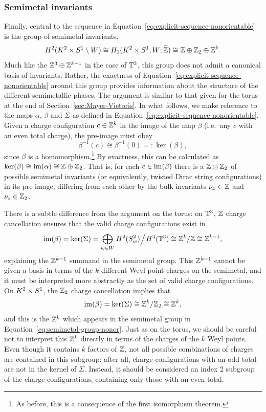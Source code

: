 \subsubsection{Semimetal invariants}

Finally, central to the sequence in Equation~\eqref{eq:explicit-sequence-nonorientable} is the group of semimetal invariants,
\begin{equation}\label{eq:semimetal-group-nonor}
	H^2(K^2\times S^1\setminus W)\cong H_1(K^2\times S^1, W; \widetilde{\mathbb{Z}})\cong \mathbb{Z}\oplus\mathbb{Z}_2\oplus\mathbb{Z}^k.
\end{equation}
Much like the $\mathbb{Z}^3\oplus\mathbb{Z}^{k-1}$ in the case of $\mathbb{T}^3$, this group does not admit a canonical basis of invariants. Rather, the exactness of Equation~\eqref{eq:explicit-sequence-nonorientable} around this group provides information about the structure of the different semimetallic phases. The argument is similar to that given for the torus at the end of Section~\ref{sec:Mayer-Vietoris}. In what follows, we make reference to the maps $\alpha$, $\beta$ and $\Sigma$ as defined in Equation~\eqref{eq:explicit-sequence-nonorientable}. Given a charge configuration $c\in\mathbb{Z}^k$ in the image of the map $\beta$ (i.e.\ any $c$ with an even total charge), the pre-image must obey
\begin{equation*}
	\beta^{-1}(c) \cong \beta^{-1}(0) =: \ker(\beta),
\end{equation*}
since $\beta$ is a homomorphism.\footnote{
	As before, this is a consequence of the first isomorphism theorem.}
By exactness, this can be calculated as $\ker(\beta)\cong\operatorname{im}(\alpha)\cong\mathbb{Z}\oplus\mathbb{Z}_2$.
That is, for each $c\in\operatorname{im}(\beta)$ there is a $\mathbb{Z}\oplus\mathbb{Z}_2$ of possible semimetal invariants (or equivalently, twisted Dirac string configurations) in its pre-image, differing from each other by the bulk invariants $\nu_x\in\mathbb{Z}$ and $\nu_z\in\mathbb{Z}_2$.

There is a subtle difference from the argument on the torus: on $\mathbb{T}^3$, $\mathbb{Z}$ charge cancellation ensures that the valid charge configurations exist in 
\begin{equation*}
	\operatorname{im}(\beta) = \ker(\Sigma) = \bigoplus_{w\in W} H^2(S_w^2) \Big/ H^3(\mathbb{T}^3) \cong \mathbb{Z}^k/\mathbb{Z} \cong \mathbb{Z}^{k-1},
\end{equation*}
explaining the $\mathbb{Z}^{k-1}$ summand in the semimetal group. This $\mathbb{Z}^{k-1}$ cannot be given a basis in terms of the $k$ different Weyl point charges on the semimetal, and it must be interpreted more abstractly as the set of valid charge configurations. On $K^2\times S^1$, the $\mathbb{Z}_2$ charge cancellation implies that
\begin{equation*}
	\operatorname{im}(\beta)=\ker(\Sigma)\cong\mathbb{Z}^k/\mathbb{Z}_2\cong\mathbb{Z}^k,
\end{equation*}
and this is the $\mathbb{Z}^k$ which appears in the semimetal group in Equation~\eqref{eq:semimetal-group-nonor}. Just as on the torus, we should be careful not to interpret this $\mathbb{Z}^k$ directly in terms of the charges of the $k$ Weyl points. Even though it contains $k$ factors of $\mathbb{Z}$, not all possible combinations of charges are contained in this subgroup: after all, charge configurations with an odd total are not in the kernel of $\Sigma$. Instead, it should be considered an index 2 subgroup of the charge configurations, containing only those with an even total.

